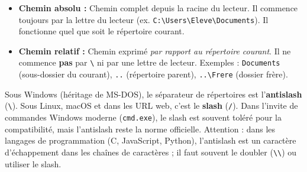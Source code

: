 \documentclass[11pt]{article}
\begin{document}
\begin{propriete}
\begin{itemize}
    \item \textbf{Chemin absolu :} Chemin complet depuis la racine du lecteur. Il commence toujours par la lettre du lecteur (ex. \texttt{C:\textbackslash Users\textbackslash Eleve\textbackslash Documents}). Il fonctionne quel que soit le répertoire courant.
    \item \textbf{Chemin relatif :} Chemin exprimé \emph{par rapport au répertoire courant}. Il ne commence \textbf{pas} par \texttt{\textbackslash} ni par une lettre de lecteur. Exemples : \texttt{Documents} (sous-dossier du courant), \texttt{..} (répertoire parent), \texttt{..\textbackslash Frere} (dossier frère).
\end{itemize}
\end{propriete}

\begin{savaistu}
Sous Windows (héritage de MS-DOS), le séparateur de répertoires est l'\textbf{antislash} (\texttt{\textbackslash}). Sous Linux, macOS et dans les URL web, c'est le \textbf{slash} (\texttt{/}). Dans l'invite de commandes Windows moderne (\texttt{cmd.exe}), le slash est souvent toléré pour la compatibilité, mais l'antislash reste la norme officielle. Attention : dans les langages de programmation (C, JavaScript, Python), l'antislash est un caractère d'échappement dans les chaînes de caractères ; il faut souvent le doubler (\texttt{\textbackslash\textbackslash}) ou utiliser le slash.
\end{savaistu}
\end{document}
